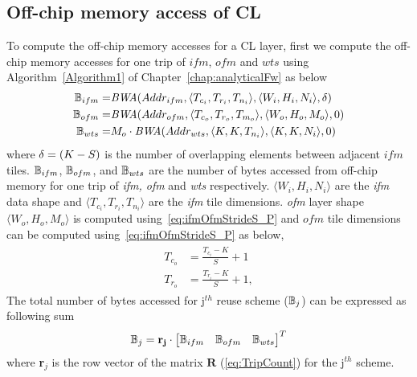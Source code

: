 \subsection{Off-chip memory access of CL}\label{sec:AccessCLData}
To compute the off-chip memory accesses for a CL layer, first we compute the off-chip memory accesses for one trip of $ifm$, $ofm$ and $wts$ using Algorithm~\ref{Algorithm1} of Chapter~\ref{chap:analyticalFw} as below
\begin{align*}
	\begin{split}
		\mathbb{B}_{ifm}=&\emph{BWA}(Addr_{ifm},\langle T_{c_i}, T_{r_i},T_{n_i}\rangle,\langle W_i,H_i,N_i\rangle,\delta)\\
		\mathbb{B}_{ofm}=&\emph{BWA}(Addr_{ofm},\langle T_{c_o},T_{r_o},T_{m_o}\rangle,\langle W_o,H_o,M_o\rangle,0)\\
		\mathbb{B}_{wts}=&M_o\cdot \emph{BWA}(Addr_{wts},\langle K,K,T_{n_i}\rangle,\langle K,K,N_i\rangle,0)
	\end{split}
\end{align*} 
where $\delta=(K-S)$ is the number of overlapping elements between adjacent $ifm$ tiles. $\mathbb{B}_{ifm}$, $\mathbb{B}_{ofm}$, and $\mathbb{B}_{wts}$ are the number of bytes accessed from off-chip memory for one trip of \textit{ifm, ofm} and \textit{wts} respectively. $\langle W_{i},H_{i},N_{i}\rangle$ are the \textit{ifm} data shape and $\langle T_{c_i},T_{r_i},T_{n_i}\rangle$ are the \textit{ifm} tile dimensions. \textit{ofm} layer shape $\langle W_{o},H_{o},M_{o}\rangle$ is computed using~\eqref{eq:ifmOfmStrideS_P} and $ofm$ tile dimensions can be computed using~\eqref{eq:ifmOfmStrideS_P} as below,
\begin{align}\label{eq:ofmAndifmTileDims}
	\begin{split}
		T_{c_o}&=\frac{T_{c_{i}}-K}{S}+1 \\
		T_{r_o}&=\frac{T_{r_{i}}-K}{S}+1,
	\end{split}
\end{align}  
The total number of bytes accessed for j$^{th}$ reuse scheme ($\mathbb{B}_j$) can be expressed as following sum
\begin{equation} \label{eq:TotalOffChipAccess}
	\mathbb{B}_j=\mathbf{r_j}\cdot \begin{bmatrix}
		\mathbb{B}_{ifm} &
		\mathbb{B}_{ofm} &
		\mathbb{B}_{wts}
	\end{bmatrix}^{T}
\end{equation}
where \textbf{r}$_j$ is the row vector of the matrix $\mathbf{R}$ (\eqref{eq:TripCount}) for the j$^{th}$ scheme. 
